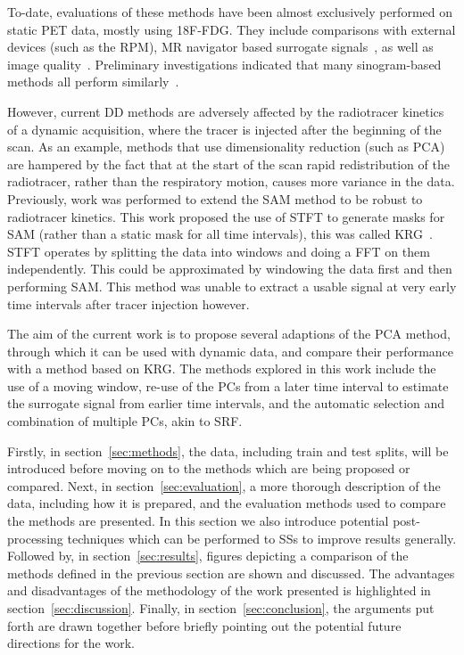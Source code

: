     To-date, evaluations of these methods have been almost exclusively performed on static \gls{PET} data, mostly using \gls{18F-FDG}. They include comparisons with external devices (such as the \gls{RPM}), \gls{MR} navigator based surrogate signals~\parencite{Manber2015PracticalPET/MR}, as well as image quality~\parencite{Buther2020ClinicalMotion, Walker2019EvaluationImaging}. Preliminary investigations indicated that many sinogram-based methods all perform similarly~\parencite{Thielemans2013ComparisonData}.
    
    However, current \gls{DD} methods are adversely affected by the radiotracer kinetics of a dynamic acquisition, where the tracer is injected after the beginning of the scan. As an example, methods that use dimensionality reduction (such as \gls{PCA}) are hampered by the fact that at the start of the scan rapid redistribution of the radiotracer, rather than the respiratory motion, causes more variance in the data. Previously, work was performed to extend the \gls{SAM} method to be robust to radiotracer kinetics. This work proposed the use of \gls{STFT} to generate masks for \gls{SAM} (rather than a static mask for all time intervals), this was called \gls{KRG}~\parencite{Schleyer2014}. \gls{STFT} operates by splitting the data into windows and doing a \gls{FFT} on them independently. This could be approximated by windowing the data first and then performing \gls{SAM}. This method was unable to extract a usable signal at very early time intervals after tracer injection however.
    
    The aim of the current work is to propose several adaptions of the \gls{PCA} method, through which it can be used with dynamic data, and compare their performance with a method based on \gls{KRG}. The methods explored in this work include the use of a moving window, re-use of the \glspl{PC} from a later time interval to estimate the surrogate signal from earlier time intervals, and the automatic selection and combination of multiple \glspl{PC}, akin to \gls{SRF}.

    Firstly, in section~\ref{sec:methods}, the data, including train and test splits, will be introduced before moving on to the methods which are being proposed or compared. Next, in section~\ref{sec:evaluation}, a more thorough description of the data, including how it is prepared, and the evaluation methods used to compare the methods are presented. In this section we also introduce potential post-processing techniques which can be performed to \glspl{SS} to improve results generally. Followed by, in section~\ref{sec:results}, figures depicting a comparison of the methods defined in the previous section are shown and discussed. The advantages and disadvantages of the methodology of the work presented is highlighted in section~\ref{sec:discussion}. Finally, in section~\ref{sec:conclusion}, the arguments put forth are drawn together before briefly pointing out the potential future directions for the work.
    
